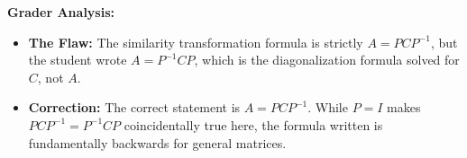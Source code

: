 \documentclass[11pt, letterpaper]{article}
\theoremstyle{definition}
\theoremstyle{remark}
\begin{document}
\textbf{Grader Analysis:}
\begin{itemize}
    \item \textbf{The Flaw:} The similarity transformation formula is strictly $A = PCP^{-1}$, but the student wrote $A = P^{-1}CP$, which is the diagonalization formula solved for $C$, not $A$.
    \item \textbf{Correction:} The correct statement is $A = PCP^{-1}$. While $P=I$ makes $PCP^{-1} = P^{-1}CP$ coincidentally true here, the formula written is fundamentally backwards for general matrices.
\end{itemize}
\end{document}
